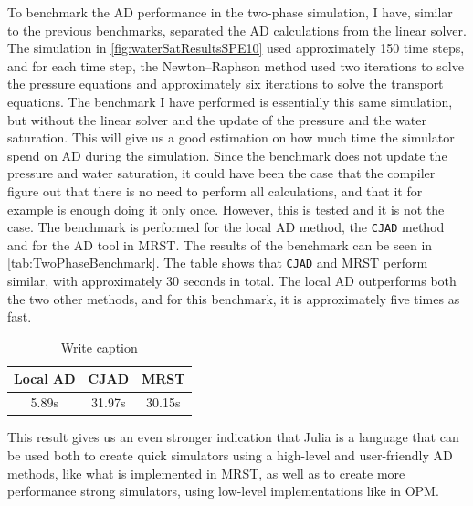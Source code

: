 To benchmark the AD performance in the two-phase simulation, I have, similar to the previous benchmarks, separated the AD calculations from the linear solver. The simulation in \autoref{fig:waterSatResultsSPE10} used approximately 150 time steps, and for each time step, the Newton--Raphson method used two iterations to solve the pressure equations and approximately six iterations to solve the transport equations. The benchmark I have performed is essentially this same simulation, but without the linear solver and the update of the pressure and the water saturation. This will give us a good estimation on how much time the simulator spend on AD during the simulation. Since the benchmark does not update the pressure and water saturation, it could have been the case that the compiler figure out that there is no need to perform all calculations, and that it for example is enough doing it only once. However, this is tested and it is not the case. The benchmark is performed for the local AD method, the \texttt{CJAD} method and for the AD tool in MRST. The results of the benchmark can be seen in \autoref{tab:TwoPhaseBenchmark}. The table shows that \texttt{CJAD} and MRST perform similar, with approximately 30 seconds in total. The local AD outperforms both the two other methods, and for this benchmark, it is approximately five times as fast.
\begin{table}[htb]
    \centering
    \caption{Write caption}
    \label{tab:TwoPhaseBenchmark}
    \def\arraystretch{1.5}
    \begin{tabular}{ccc}
    \textbf{Local AD} & \textbf{CJAD} & \textbf{MRST}\\
        \hline
        5.89s & 31.97s & 30.15s \\  
        \hline
    \end{tabular}
\end{table}
This result gives us an even stronger indication that Julia is a language that can be used both to create quick simulators using a high-level and user-friendly AD methods, like what is implemented in MRST, as well as to create more performance strong simulators, using low-level implementations like in OPM.

